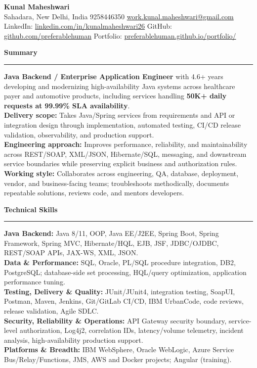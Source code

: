 \documentclass[11pt,letterpaper]{article}
\newcommand{\ressection}[1]{\Needspace{6\baselineskip}\vspace{8pt}\par\textbf{#1}\par\vspace{2pt}\hrule\vspace{5pt}}
\begin{document}
\pagestyle{empty}\raggedright\fontsize{11}{12.5}\selectfont

{\Large \textbf{Kunal Maheshwari}}\\
Sahadara, New Delhi, India \textbar{} 9258446350 \textbar{} \href{mailto:work.kunal.maheshwari@gmail.com}{work.kunal.maheshwari@gmail.com}\\
LinkedIn: \href{https://www.linkedin.com/in/kunalmaheshwari26}{linkedin.com/in/kunalmaheshwari26} \textbar{} GitHub: \href{https://github.com/preferablehuman}{github.com/preferablehuman} \textbar{} Portfolio: \href{https://preferablehuman.github.io/portfolio/}{preferablehuman.github.io/portfolio/}

\ressection{Summary}
\textbf{Java Backend / Enterprise Application Engineer} with 4.6+ years developing and modernizing high-availability Java systems across healthcare payer and automotive products, including services handling \textbf{50K+ daily requests at 99.99\% SLA availability}.\\[2pt]
\textbf{Delivery scope:} Takes Java/Spring services from requirements and API or integration design through implementation, automated testing, CI/CD release validation, observability, and production support.\\[2pt]
\textbf{Engineering approach:} Improves performance, reliability, and maintainability across REST/SOAP, XML/JSON, Hibernate/SQL, messaging, and downstream service boundaries while preserving explicit business and authorization rules.\\[2pt]
\textbf{Working style:} Collaborates across engineering, QA, database, deployment, vendor, and business-facing teams; troubleshoots methodically, documents repeatable solutions, reviews code, and mentors developers.

\ressection{Technical Skills}
\textbf{Java Backend:} Java 8/11, OOP, Java EE/J2EE, Spring Boot, Spring Framework, Spring MVC, Hibernate/HQL, EJB, JSF, JDBC/OJDBC, REST/SOAP APIs, JAX-WS, XML, JSON.\\
\textbf{Data \& Performance:} SQL, Oracle, PL/SQL procedure integration, DB2, PostgreSQL; database-side set processing, HQL/query optimization, application performance tuning.\\
\textbf{Testing, Delivery \& Quality:} JUnit/JUnit4, integration testing, SoapUI, Postman, Maven, Jenkins, Git/GitLab CI/CD, IBM UrbanCode, code reviews, release validation, Agile SDLC.\\
\textbf{Security, Reliability \& Operations:} API Gateway security boundary, service-level authorization, Log4j2, correlation IDs, latency/volume telemetry, incident analysis, high-availability production support.\\
\textbf{Platforms \& Breadth:} IBM WebSphere, Oracle WebLogic, Azure Service Bus/Relay/Functions, JMS, AWS and Docker projects; Angular (training).
\end{document}
